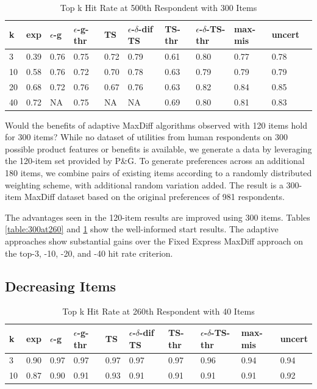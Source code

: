 \documentclass[nonblindrev]{informs3}
\newcommand{\fixedexpressS}{\textbf{exp}}
\newcommand{\egreedyS}{$\epsilon$-\textbf{g}}
\newcommand{\egreedythresS}{$\epsilon$-\textbf{g-thr}}
\newcommand{\misminS}{\textbf{max-mis}}
\newcommand{\tsS}{\textbf{TS} }
\newcommand{\edtsS}{$\epsilon$-$\delta$-\textbf{dif TS} }
\newcommand{\tsthresS}{\textbf{TS-thr} }
\newcommand{\edtsthresS}{$\epsilon$-$\delta$-\textbf{TS-thr} }
\newcommand{\uncertS}{\textbf{uncert} }
\begin{document}
\begin{table}
\caption{Top k Hit Rate at 500th Respondent with 300 Items}
\begin{center}
\begin{tabular}{lllllllllll}
\hline   k &  \fixedexpressS & \egreedyS&\egreedythresS&\tsS&\edtsS&\tsthresS&\edtsthresS& \misminS& \uncertS  \\ \hline  
3 & 0.39 &  0.76 & 0.75 & 0.72 & 0.79 & 0.61 &  0.80 &  0.77 &0.78 \\
10 &  0.58 &   0.76 & 0.72 & 0.70 & 0.78 & 0.63 & 0.79 & 0.79 &   0.79\\
20 & 0.68 & 0.72 & 0.76 & 0.67 & 0.76 &  0.63 & 0.82 & 0.84 &    0.85 \\ 
40 & 0.72 &   NA & 0.75 & NA & NA & 0.69 & 0.80 &0.81 & 0.83 \end{tabular}
\end{center}
\label{table:300at500}
\end{table}
Would the benefits of adaptive MaxDiff algorithms observed with 120 items hold for 300 items? While no dataset of utilities from human respondents on 300 possible product features or benefits is available, we generate a data by leveraging the 120-item set provided by P\&G. To generate preferences across an additional 180 items, we combine pairs of existing items according to a randomly distributed weighting scheme, with additional random variation added. The result is a 300-item MaxDiff dataset based on the original preferences of 981 respondents.

The advantages seen in the 120-item results are improved using 300 items. Tables \ref{table:300at260} and \ref{table:300at500} show the well-informed start results. The adaptive approaches show substantial gains over the Fixed Express MaxDiff approach on the top-3, -10, -20, and -40 hit rate criterion.

\subsection{Decreasing Items}

\begin{table}
\caption{Top k Hit Rate at 260th Respondent with 40 Items}
\begin{center}
\begin{tabular}{llllllllll}
\hline   k &  \fixedexpressS & \egreedyS&\egreedythresS&\tsS&\edtsS&\tsthresS&\edtsthresS& \misminS& \uncertS  \\ \hline  3 & 0.90 & 0.97 &  0.97 &  0.97 & 0.97 & 0.97 &  0.96 & 0.94 &  0.94 \\  10 & 0.87 & 0.90 & 0.91 &  0.93 & 0.91 & 0.91 & 0.91 & 0.91 &  0.92  \end{tabular}
\end{center}
\label{table:40at260}
\end{table}
\end{document}
